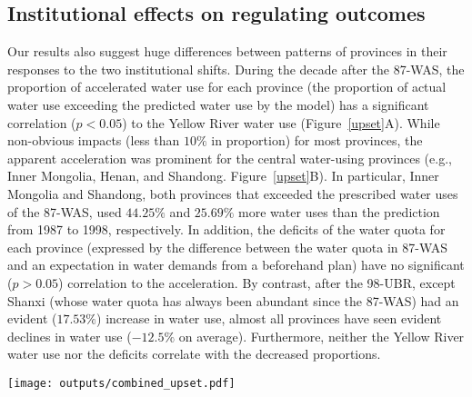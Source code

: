 \subsection{Institutional effects on regulating outcomes}
\label{result-3}
Our results also suggest huge differences between patterns of provinces in their responses to the two institutional shifts.
During the decade after the 87-WAS, the proportion of accelerated water use for each province (the proportion of actual water use exceeding the predicted water use by the model) has a significant correlation ($p<0.05$) to the Yellow River water use (Figure~\ref{upset}A).
While non-obvious impacts (less than $10\%$ in proportion) for most provinces, the apparent acceleration was prominent for the central water-using provinces (e.g., Inner Mongolia, Henan, and Shandong. Figure~\ref{upset}B).
In particular, Inner Mongolia and Shandong, both provinces that exceeded the prescribed water uses of the 87-WAS, used $44.25\%$ and $25.69\%$ more water uses than the prediction from 1987 to 1998, respectively.
In addition, the deficits of the water quota for each province (expressed by the difference between the water quota in 87-WAS and an expectation in water demands from a beforehand plan) have no significant ($p>0.05$) correlation to the acceleration.
By contrast, after the 98-UBR, except Shanxi (whose water quota has always been abundant since the 87-WAS) had an evident ($17.53\%$) increase in water use, almost all provinces have seen evident declines in water use ($-12.5\%$ on average).
Furthermore, neither the Yellow River water use nor the deficits correlate with the decreased proportions.

\begin{figure*}[!h]
    \centering
    \texttt{[image: outputs/combined\_upset.pdf]}
    \caption{Responses of the provinces to the institutional shifts (upper: the 87-WAS, lower: the 98-UBR).
        \textbf{A.} The partial correlation coefficient between water use (WU) of Yellow River (YR), unsatisfied ratio (compared with requirements in water plan and supply in the 87-WAS), and the average accelerated ratio.
        \textbf{B.} Average accelerated ratio of water uses for each province in the YRB during the decade after 87-WAS (from 1987 to 1998).
        \textbf{Mian users:} Major water consumption provinces (over the median).
        \textbf{Overused:} violate the 87-WAS in average water uses.
    }
    \label{upset}
\end{figure*}
